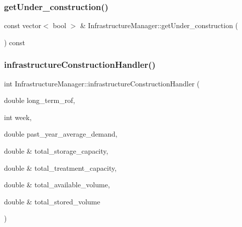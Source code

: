 \subsubsection{\texorpdfstring{get\+Under\+\_\+construction()}{getUnder\_construction()}}
{\footnotesize\ttfamily const vector$<$ bool $>$ \& Infrastructure\+Manager\+::get\+Under\+\_\+construction (\begin{DoxyParamCaption}{ }\end{DoxyParamCaption}) const}

\mbox{\label{classInfrastructureManager_a06c7a2df105a2a8dd3ef625ad42694ce_a06c7a2df105a2a8dd3ef625ad42694ce}} 
\subsubsection{\texorpdfstring{infrastructure\+Construction\+Handler()}{infrastructureConstructionHandler()}}
{\footnotesize\ttfamily int Infrastructure\+Manager\+::infrastructure\+Construction\+Handler (\begin{DoxyParamCaption}\item[{double}]{long\+\_\+term\+\_\+rof,  }\item[{int}]{week,  }\item[{double}]{past\+\_\+year\+\_\+average\+\_\+demand,  }\item[{double \&}]{total\+\_\+storage\+\_\+capacity,  }\item[{double \&}]{total\+\_\+treatment\+\_\+capacity,  }\item[{double \&}]{total\+\_\+available\+\_\+volume,  }\item[{double \&}]{total\+\_\+stored\+\_\+volume }\end{DoxyParamCaption})}

